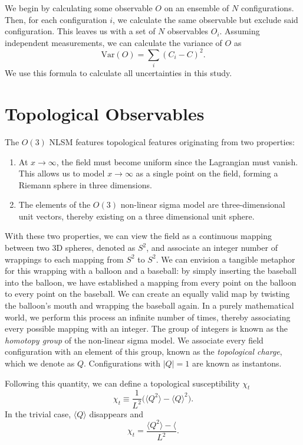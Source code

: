 We begin by calculating some observable $O$ on an ensemble of $N$ configurations. Then, for each configuration $i$, we calculate the same observable but exclude said configuration. This leaves us with a set of $N$ observables $O_i$. Assuming independent measurements, we can calculate the variance of $O$ as
\begin{equation}
    \mathrm{Var}(O) = \sum_{i} \left(C_i - C\right)^2.
\end{equation}
We use this formula to calculate all uncertainties in this study.
\section{Topological Observables}
\label{sec:topological charge}
The $O(3)$ NLSM features topological features originating from two properties: 
\begin{enumerate}
    \item At $x\rightarrow\infty$, the field must become uniform since the Lagrangian must vanish. This allows us to model $x\rightarrow\infty$ as a single point on the field, forming a Riemann sphere in three dimensions.
    \item The elements of the $O(3)$ non-linear sigma model are three-dimensional unit vectors, thereby existing on a three dimensional unit sphere. 
\end{enumerate}

With these two properties, we can view the field as a continuous mapping between two 3D spheres, denoted as $S^2$, and associate an integer number of wrappings to each mapping from $S^2$ to $S^2$. We can envision a tangible metaphor for this wrapping with a balloon and a baseball: by simply inserting the baseball into the balloon, we have established a mapping from every point on the balloon to every point on the baseball. We can create an equally valid map by twisting the balloon's mouth and wrapping the baseball again. In a purely mathematical world, we perform this process an infinite number of times, thereby associating every possible mapping with an integer. The group of integers is known as the \textit{homotopy group} of the non-linear sigma model. We associate every field configuration with an element of this group, known as the \textit{topological charge}, which we denote as $Q$. Configurations with $|Q|=1$ are known as instantons.

Following this quantity, we can define a topological susceptibility $\chi_t$
\begin{equation}
\chi_t \equiv \frac{1}{L^2} \Big( \langle Q^2 \rangle - \langle Q \rangle^2 \Big).
\end{equation}
In the trivial case, $\langle Q \rangle$ disappears and   
\begin{equation}
    \chi_t = \frac{\langle Q^2 \rangle - \langle}{L^2}.
\end{equation}

